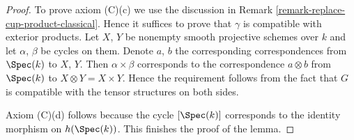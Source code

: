 \begin{proof}
\medskip\noindent
To prove axiom (C)(c) we use the discussion in
Remark \ref{remark-replace-cup-product-classical}.
Hence it suffices to prove that $\gamma$ is compatible with
exterior products. Let $X$, $Y$ be nonempty smooth projective
schemes over $k$ and let $\alpha$, $\beta$ be cycles on them. Denote
$a$, $b$ the corresponding correspondences from $\Spec(k)$ to
$X$, $Y$. Then $\alpha \times \beta$ corresponds to the
correspondence $a \otimes b$ from $\Spec(k)$ to $X \otimes Y = X \times Y$.
Hence the requirement follows from the fact that $G$ is
compatible with the tensor structures on both sides.

\medskip\noindent
Axiom (C)(d) follows because the cycle $[\Spec(k)]$
corresponds to the identity morphism on $h(\Spec(k))$.
This finishes the proof of the lemma.
\end{proof}
